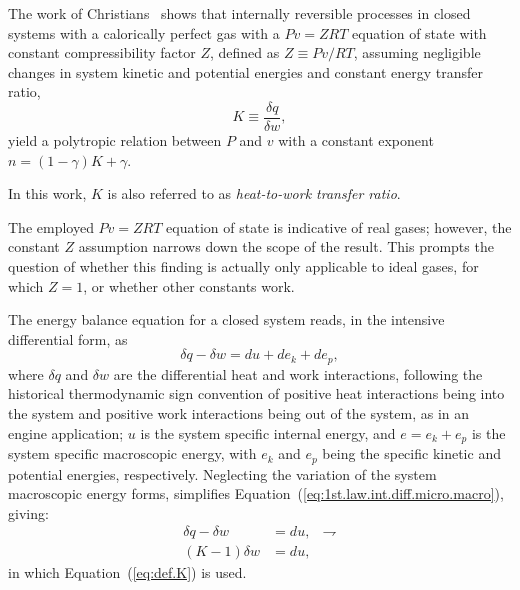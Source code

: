 \documentclass[fleqn,11pt]{SelfArx}
\begin{document}
    The  work  of  Christians~\cite{2012-ChristiansJ-IntJMechEngEduc}  shows   that   internally
    reversible processes in closed systems with a calorically perfect gas  with  a  $Pv  =  ZRT$
    equation of state with constant compressibility factor $Z$, defined  as  $Z  \equiv  Pv/RT$,
    assuming negligible changes in system kinetic and potential  energies  and  constant  energy
    transfer ratio,
    \begin{equation}
        K \equiv \frac{\delta q}{\delta w},
        \label{eq:def.K}
    \end{equation}
    \noindent yield a polytropic relation between $P$ and $v$ with a constant exponent $n = (1 -
    \gamma)K + \gamma$.

    In this work, $K$ is also referred to as \emph{heat-to-work transfer ratio}.

    The employed $Pv = ZRT$ equation of state is indicative of real gases; however, the constant
    $Z$ assumption narrows down the scope of the result. This prompts the  question  of  whether
    this finding is actually only applicable to ideal gases, for which $Z=1$, or  whether  other
    constants work.

    The energy balance equation for a closed system reads, in the intensive  differential  form,
    as
    \begin{equation}
        \delta q - \delta w = du + de_k + de_p,
        \label{eq:1st.law.int.diff.micro.macro}
    \end{equation}
    \noindent where $\delta q$ and $\delta w$ are the differential heat and  work  interactions,
    following the historical thermodynamic sign convention of positive heat  interactions  being
    into the system and positive work interactions being out of the  system,  as  in  an  engine
    application; $u$ is the system specific internal energy, and $e = e_k + e_p$ is  the  system
    specific macroscopic energy, with $e_k$ and $e_p$ being the specific kinetic  and  potential
    energies, respectively. Neglecting the variation of the system macroscopic energy forms,
    simplifies Equation~(\ref{eq:1st.law.int.diff.micro.macro}), giving:
    \begin{align}
        \delta q - \delta w & = du, & \rightharpoondown
        \label{eq:1st.law.int.diff} \\
        (K-1)\delta w & = du,
        \label{eq:1st.law.int.diff.K}
    \end{align}
    \noindent in which Equation~(\ref{eq:def.K}) is used.
\end{document}
